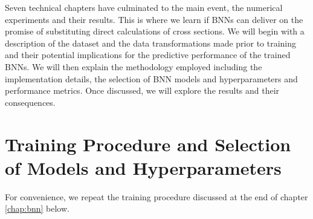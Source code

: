 Seven technical chapters have culminated to the main event, the numerical experiments and their results. This is where we learn if BNNs can deliver on the promise of substituting direct calculations of cross sections. We will begin with a description of the dataset and the data transformations made prior to training and their potential implications for the predictive performance of the trained BNNs. We will then explain the methodology employed including the implementation details, the selection of BNN models and hyperparameters and performance metrics. Once discussed, we will explore the results and their consequences.


\section{Training Procedure and Selection of Models and Hyperparameters}
For convenience, we repeat the training procedure discussed at the end of chapter \ref{chap:bnn} below.
